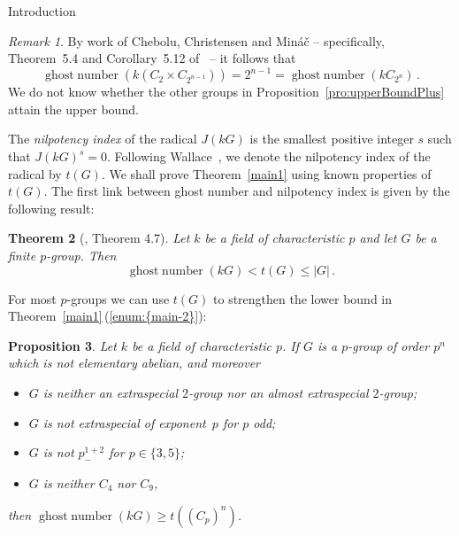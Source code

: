 \documentclass[12pt,reqno]{amsart}
\newtheorem{thm}{Theorem}[section]
\newtheorem{pro}[thm]{Proposition}
\theoremstyle{definition}
\theoremstyle{remark}
\newtheorem{rem}[thm]{Remark}
\begin{document}
\begin{section} {Introduction}
\begin{rem}
By work of Chebolu, Christensen and Min\'{a}\v{c} -- specifically, Theorem~5.4 and Corollary~5.12 of~\cite{CheboluChristensenMinac:ghosts} -- it follows that
\[
{\operatorname{ghost\;number}}(k(C_2 \times C_{2^{n-1}})) = 2^{n-1} = {\operatorname{ghost\;number}}(kC_{2^n}) \, .
\]
We do not know whether the other groups in Proposition~\ref{pro:upperBoundPlus} attain the upper bound.
\end{rem}

\noindent
The \emph{nilpotency index} of the radical $J(kG)$ is the smallest positive integer $s$ such that $J(kG)^s = 0$. Following Wallace~\cite{Wallace:lowerBounds}, we denote the nilpotency index of the radical by $t(G)$. We shall prove Theorem~\ref{main1} using known properties of~$t(G)$. The first link between ghost number and nilpotency index is given by the following result:

\begin{thm} [\cite{CheboluChristensenMinac:ghosts}, Theorem 4.7]
\label{upperbound}
Let $k$ be a field of characteristic $p$ and let $G$ be a finite $p$-group. Then 
\[
{\operatorname{ghost\;number}}(kG) < t(G) \leq {\left\vert{G}\right\vert} \, .
\]
\end{thm}

\noindent
For most $p$-groups we can use $t(G)$ to strengthen the lower bound in Theorem~\ref{main1}\,({\ref{enum:{main-2}}}):

\begin{pro}
\label{main3}
Let $k$ be a field of characteristic $p$. If  $G$ is a $p$-group of order $p^n$ which is not elementary abelian, and moreover
\begin{itemize}
\item
$G$ is neither an extraspecial $2$-group nor an almost extraspecial $2$-group;
\item
$G$ is not extraspecial of exponent~$p$ for $p$ odd;
\item
$G$ is not $p^{1+2}_-$ for $p \in \{3,5\}$;
\item
$G$ is neither $C_4$ nor $C_9$,
\end{itemize}
then \quad ${\operatorname{ghost\;number}}(kG) \geq t((C_p)^n)$.
\end{pro}

\end{section}
\end{document}
